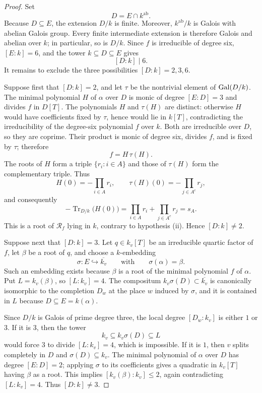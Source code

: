 \begin{proof}
Set
\[
 D=E\cap k^{\mathrm{ab}}.
\]
Because $D\subseteq E$, the extension $D/k$ is finite.  Moreover,
$k^{\mathrm{ab}}/k$ is Galois with abelian Galois group.  Every finite
intermediate extension is therefore Galois and abelian over $k$; in
particular, so is $D/k$.  Since $f$ is irreducible of degree six,
$[E:k]=6$, and the tower $k\subseteq D\subseteq E$ gives
\[
 [D:k]\mid6.
\]
It remains to exclude the three possibilities $[D:k]=2,3,6$.

Suppose first that $[D:k]=2$, and let $\tau$ be the nontrivial element
of $\operatorname{Gal}(D/k)$.  The minimal polynomial $H$ of $\alpha$ over $D$ is
monic of degree $[E:D]=3$ and divides $f$ in $D[T]$.  The polynomials
$H$ and $\tau(H)$ are distinct: otherwise $H$ would have coefficients
fixed by $\tau$, hence would lie in $k[T]$, contradicting the
irreducibility of the degree-six polynomial $f$ over $k$.  Both are
irreducible over $D$, so they are coprime.  Their product is monic of
degree six, divides $f$, and is fixed by $\tau$; therefore
\[
 f=H\,\tau(H).
\]
The roots of $H$ form a triple $\{r_i:i\in A\}$ and those of
$\tau(H)$ form the complementary triple.  Thus
\[
 H(0)=-\prod_{i\in A}r_i,
 \qquad
 \tau(H)(0)=-\prod_{j\in A^c}r_j,
\]
and consequently
\[
 -\operatorname{Tr}_{D/k}\bigl(H(0)\bigr)
 =\prod_{i\in A}r_i+\prod_{j\in A^c}r_j
 =s_A.
\]
This is a root of $\mathcal R_f$ lying in $k$, contrary to hypothesis
\textup{(ii)}.  Hence $[D:k]\ne2$.

Suppose next that $[D:k]=3$.  Let $q\in k_v[T]$ be an irreducible
quartic factor of $f$, let $\beta$ be a root of $q$, and choose a
$k$-embedding
\[
 \sigma:E\hookrightarrow\overline{k_v}
 \qquad\text{with}\qquad
 \sigma(\alpha)=\beta.
\]
Such an embedding exists because $\beta$ is a root of the minimal
polynomial $f$ of $\alpha$.  Put $L=k_v(\beta)$, so $[L:k_v]=4$.
The compositum $k_v\sigma(D)\subset\overline{k_v}$ is canonically
isomorphic to the completion $D_w$ at the place $w$ induced by
$\sigma$, and it is contained in $L$ because $D\subseteq E=k(\alpha)$.

Since $D/k$ is Galois of prime degree three, the local degree
$[D_w:k_v]$ is either $1$ or $3$.  If it is $3$, then the tower
\[
 k_v\subseteq k_v\sigma(D)\subseteq L
\]
would force $3$ to divide $[L:k_v]=4$, which is impossible.  If it is
$1$, then $v$ splits completely in $D$ and $\sigma(D)\subseteq k_v$.
The minimal polynomial of $\alpha$ over $D$ has degree
$[E:D]=2$; applying $\sigma$ to its coefficients gives a quadratic in
$k_v[T]$ having $\beta$ as a root.  This implies
$[k_v(\beta):k_v]\leq2$, again contradicting $[L:k_v]=4$.  Thus
$[D:k]\ne3$.


\end{proof}
